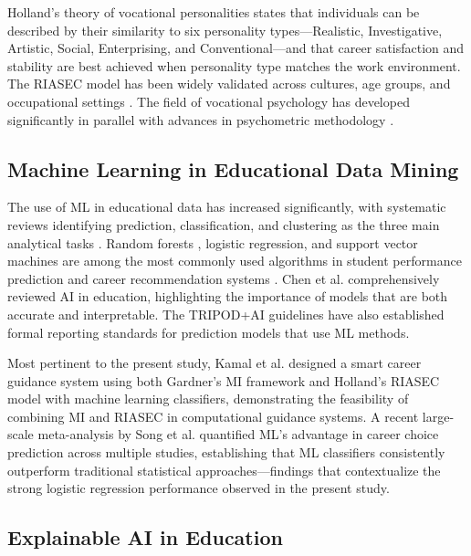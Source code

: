 \documentclass[12pt, a4paper]{article}
\begin{document}
Holland's \citeyear{holland1997making} theory of vocational personalities states that individuals can be described by their similarity to six personality types---Realistic, Investigative, Artistic, Social, Enterprising, and Conventional---and that career satisfaction and stability are best achieved when personality type matches the work environment. The RIASEC model has been widely validated across cultures, age groups, and occupational settings \cite{nauta2010holland}. The field of vocational psychology has developed significantly in parallel with advances in psychometric methodology \cite{sackett2017individualized}.

\subsection{Machine Learning in Educational Data Mining}

The use of ML in educational data has increased significantly, with systematic reviews identifying prediction, classification, and clustering as the three main analytical tasks \cite{romero2020educational, zawacki2019systematic}. Random forests \cite{breiman2001random}, logistic regression, and support vector machines are among the most commonly used algorithms in student performance prediction and career recommendation systems \cite{guleria2022explainable}. Chen et al. \citeyear{chen2020artificial} comprehensively reviewed AI in education, highlighting the importance of models that are both accurate and interpretable. The TRIPOD+AI guidelines \cite{collins2024tripod} have also established formal reporting standards for prediction models that use ML methods.

Most pertinent to the present study, Kamal et al. \citeyear{kamal2021smart} designed a smart career guidance system using both Gardner's MI framework and Holland's RIASEC model with machine learning classifiers, demonstrating the feasibility of combining MI and RIASEC in computational guidance systems. A recent large-scale meta-analysis by Song et al. \citeyear{song2024investigating} quantified ML's advantage in career choice prediction across multiple studies, establishing that ML classifiers consistently outperform traditional statistical approaches---findings that contextualize the strong logistic regression performance observed in the present study.

\subsection{Explainable AI in Education}
\end{document}
